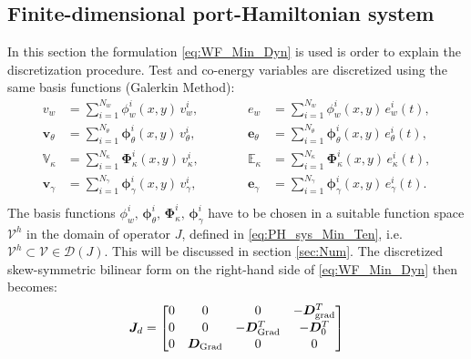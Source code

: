 \documentclass[preprint,12pt]{elsarticle}
\begin{document}
\subsection{Finite-dimensional port-Hamiltonian system}
\label{sec:FD_system}
{
In this section the formulation \eqref{eq:WF_Min_Dyn} is used is order to explain the discretization procedure. Test and co-energy variables are discretized using the same basis functions (Galerkin Method):
\begin{equation}
\begin{aligned}
v_w &= \sum_{i = 1}^{N_w} \phi_w^i(x,y) \, v_w^i, \\
\bm{v}_\theta &= \sum_{i = 1}^{N_\theta} \bm\phi_\theta^i(x,y) \, v_\theta^i, \\
\mathbb{V}_\kappa &= \sum_{i = 1}^{N_\kappa} \bm\Phi_\kappa^i(x,y) \, v_\kappa^i,\\
\bm{v}_{\gamma} &= \sum_{i = 1}^{N_{\gamma}} \bm\phi_{\gamma}^i(x,y) \, v_{\gamma}^i,\\
\end{aligned} \qquad \quad
\begin{aligned}
e_w &= \sum_{i = 1}^{N_w} \phi_w^i(x,y) \, e_w^i(t),  \\
\bm{e}_\theta &= \sum_{i = 1}^{N_\theta} \bm\phi_\theta^i(x,y) \, e_\theta^i(t), \\
\mathbb{E}_\kappa &= \sum_{i = 1}^{N_\kappa} \bm\Phi_\kappa^i(x,y) \, e_\kappa^i(t),\\
\bm{e}_{\gamma} &= \sum_{i = 1}^{N_{\gamma}} \bm\phi_{\gamma}^i(x,y) \, e_{\gamma}^i(t).\\
\end{aligned} 
\end{equation}
The basis functions $\phi_w^i, \, \bm\phi_\theta^i, \, \bm\Phi_\kappa^i, \, \bm\phi_{\gamma}^i$ have to be chosen in a suitable function space $\mathcal{V}^h$ in the domain of operator $J$, defined in \eqref{eq:PH_sys_Min_Ten}, i.e. $\mathcal{V}^h \subset \mathcal{V} \in \mathcal{D}(J)$. This will be discussed in section \ref{sec:Num}. The discretized skew-symmetric bilinear form on the right-hand side of \eqref{eq:WF_Min_Dyn} then becomes:
\begin{equation}
\bm{J}_d = 
\begin{bmatrix}
0 & 0 & 0 & -\bm{D}_{\mathrm{grad}}^T      \vspace{.3mm}\\ 
0 & 0 & -\bm{D}_{\mathrm{Grad}}^T & -\bm{D}_0^T \vspace{.3mm}\\
0 & \bm{D}_{\mathrm{Grad}} & 0 & 0         \vspace{.3mm}\\

\end{bmatrix}
\end{equation}}
\end{document}
